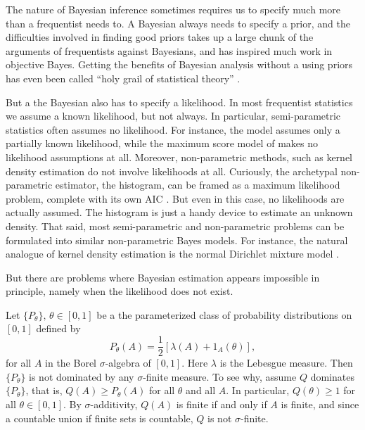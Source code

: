 The nature of Bayesian inference sometimes requires us to specify
much more than a frequentist needs to. A Bayesian always needs to
specify a prior, and the difficulties involved in finding good priors
takes up a large chunk of the arguments of frequentists against Bayesians,
and has inspired much work in objective Bayes. Getting the benefits
of Bayesian analysis without a using priors has even been called ``holy
grail of statistical theory'' \parencite{Efron2010-is}. 

But a the Bayesian also has to specify a likelihood. In most frequentist
statistics we assume a known likelihood, but not always. In particular,
semi-parametric statistics often assumes no likelihood. For instance,
the \cite{Cox1972-xd} model assumes only a partially known likelihood,
while the maximum score model of \cite{Manski1975-gl} makes no likelihood
assumptions at all. Moreover, non-parametric methods, such as kernel
density estimation \parencite{Silverman1986-nt} do not involve likelihoods
at all. Curiously, the archetypal non-parametric estimator, the histogram,
can be framed as a maximum likelihood problem, complete with its own
AIC \parencite{Birge2006-nl}. But even in this case, no likelihoods are
actually assumed. The histogram is just a handy device to estimate
an unknown density. That said, most semi-parametric and non-parametric
problems can be formulated into similar non-parametric Bayes models.
For instance, the natural analogue of kernel density estimation is
the normal Dirichlet mixture model \parencite[Chapter 2.2]{Muller2015-xn}.

But there are problems where Bayesian estimation appears impossible
in principle, namely when the likelihood does not exist.
\begin{example}
\label{exa:no likelihood}Let $\{P_{\theta}\},\,\theta\in[0,1]$
be a the parameterized class of probability distributions on $[0,1]$
defined by
\begin{equation}
P_{\theta}(A)=\frac{1}{2}[\lambda(A)+1_{A}(\theta)],\label{eq:no likelihood}
\end{equation}
for all $A$ in the Borel $\sigma$-algebra of $[0,1]$. Here $\lambda$
is the Lebesgue measure. Then $\{P_{\theta}\}$ is not dominated by
any $\sigma$-finite measure. To see why, assume $Q$ dominates $\{P_{\theta}\}$,
that is, $Q(A)\geq P_{\theta}(A)$ for all $\theta$ and all $A$.
In particular, $Q(\theta)\geq1$ for all $\theta\in[0,1]$. By $\sigma$-additivity,
$Q(A)$ is finite if and only if $A$ is finite, and since a countable
union if finite sets is countable, $Q$ is not $\sigma$-finite.
\end{example}

